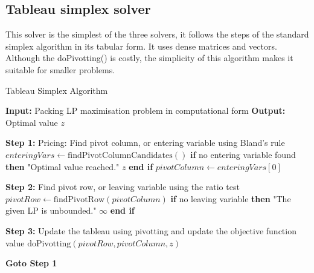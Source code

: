 \subsection{Tableau simplex solver}
This solver is the simplest of the three solvers, it follows the steps of the standard simplex
algorithm in its tabular form. It uses dense matrices and vectors. Although the
doPivotting() is costly, the simplicity of this algorithm makes it suitable for
smaller problems.
\begin{algorithm}
    \caption{Tableau Simplex Algorithm}
    \begin{algorithmic}[1]
        \State \textbf{Input:} Packing LP maximisation problem in computational form
        \State \textbf{Output:} Optimal value $z$

        \State \textbf{Step 1:} Pricing: Find pivot column, or entering variable using Bland's rule
        \State \hspace{\algorithmicindent} $enteringVars \gets \text{findPivotColumnCandidates}()$
        \State \hspace{\algorithmicindent} \textbf{if} no entering variable found \textbf{then}
        \State \hspace{\algorithmicindent} \hspace{\algorithmicindent}  "Optimal value reached."
        \State \hspace{\algorithmicindent} \hspace{\algorithmicindent} \Return $z$
        \State \hspace{\algorithmicindent} \textbf{end if}
        \State \hspace{\algorithmicindent} $pivotColumn \gets enteringVars[0]$

        \State \textbf{Step 2:} Find pivot row, or leaving variable using the ratio test
        \State \hspace{\algorithmicindent} $pivotRow \gets \text{findPivotRow}(pivotColumn)$
        \State \hspace{\algorithmicindent} \textbf{if} no leaving variable \textbf{then}
        \State \hspace{\algorithmicindent} \hspace{\algorithmicindent}  "The given LP is unbounded."
        \State \hspace{\algorithmicindent} \hspace{\algorithmicindent} \Return $\infty$
        \State \hspace{\algorithmicindent} \textbf{end if}

        \State \textbf{Step 3:} Update the tableau using pivotting and update the objective function value
        \State \hspace{\algorithmicindent} $\text{doPivotting}(pivotRow, pivotColumn, z)$

        \State \textbf{Goto Step 1}
    \end{algorithmic}
\end{algorithm}

